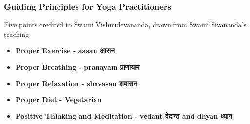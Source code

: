 \begin{frame}[fragile]\frametitle{Guiding Principles for Yoga Practitioners}

Five points credited to Swami Vishnudevananda, drawn from Swami Sivananda's teaching

    \begin{itemize}
        \item \textbf{Proper Exercise - aasan आसन}
            
            
        \item \textbf{Proper Breathing - pranayam प्राणायाम}
            
            
        \item \textbf{Proper Relaxation - shavasan  शवासन }
            
            
        \item \textbf{Proper Diet - Vegetarian}
            
            
        \item \textbf{Positive Thinking and Meditation - vedant  वेदान्त  and dhyan ध्यान }
            
            
    \end{itemize}
\end{frame}

